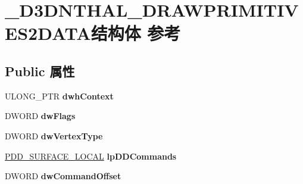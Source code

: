 \hypertarget{struct___d3_d_n_t_h_a_l___d_r_a_w_p_r_i_m_i_t_i_v_e_s2_d_a_t_a}{}\section{\+\_\+\+D3\+D\+N\+T\+H\+A\+L\+\_\+\+D\+R\+A\+W\+P\+R\+I\+M\+I\+T\+I\+V\+E\+S2\+D\+A\+T\+A结构体 参考}
\label{struct___d3_d_n_t_h_a_l___d_r_a_w_p_r_i_m_i_t_i_v_e_s2_d_a_t_a}
\subsection*{Public 属性}
\begin{DoxyCompactItemize}
\item 
\mbox{\label{struct___d3_d_n_t_h_a_l___d_r_a_w_p_r_i_m_i_t_i_v_e_s2_d_a_t_a_aaf5e38f6d8bc55f14733997c058616ed}} 
U\+L\+O\+N\+G\+\_\+\+P\+TR {\bfseries dwh\+Context}
\item 
\mbox{\label{struct___d3_d_n_t_h_a_l___d_r_a_w_p_r_i_m_i_t_i_v_e_s2_d_a_t_a_a1ff69a034cbb9688314b397d5eea6bcc}} 
D\+W\+O\+RD {\bfseries dw\+Flags}
\item 
\mbox{\label{struct___d3_d_n_t_h_a_l___d_r_a_w_p_r_i_m_i_t_i_v_e_s2_d_a_t_a_a3df0d8733e0d3b02ecfe38fb7a51876a}} 
D\+W\+O\+RD {\bfseries dw\+Vertex\+Type}
\item 
\mbox{\label{struct___d3_d_n_t_h_a_l___d_r_a_w_p_r_i_m_i_t_i_v_e_s2_d_a_t_a_a15dfc0bd7e71333b6de5616f1e874048}} 
\hyperlink{struct___d_d___s_u_r_f_a_c_e___l_o_c_a_l}{P\+D\+D\+\_\+\+S\+U\+R\+F\+A\+C\+E\+\_\+\+L\+O\+C\+AL} {\bfseries lp\+D\+D\+Commands}
\item 
\mbox{\label{struct___d3_d_n_t_h_a_l___d_r_a_w_p_r_i_m_i_t_i_v_e_s2_d_a_t_a_afc98c7785beb9b0fbb78a8ef4a245d4c}} 
D\+W\+O\+RD {\bfseries dw\+Command\+Offset}
\item 
\mbox{\label{struct___d3_d_n_t_h_a_l___d_r_a_w_p_r_i_m_i_t_i_v_e_s2_d_a_t_a_a4104b37a5933a8d337e576a1afd85edc}} 

\end{DoxyCompactItemize}
